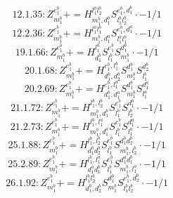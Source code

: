 \documentclass[letterpaper,10pt,fleqn,leqno,onecolumn]{article}
\begin{document}
\begin{equation} \;\;\;\;\;\;  12.1.35: Z^{e_{1}^{b}}_{m_{1}^{b}}+=H^{l_{1}^{b}l_{2}^{b}}_{m_{1}^{b},d_{1}^{b}}S^{e_{1}^{b},d_{1}^{b}}_{l_{1}^{b}l_{2}^{b}}\cdot -1/1 \end{equation}
\begin{equation} \;\;\;\;\;\;  12.2.36: Z^{e_{1}^{b}}_{m_{1}^{b}}+=H^{l_{1}^{a}l_{1}^{b}}_{m_{1}^{b},d_{1}^{a}}S^{e_{1}^{b},d_{1}^{a}}_{l_{1}^{a}l_{1}^{b}}\cdot -1/1 \end{equation}
\begin{equation} \;\;\;\;\;\;  19.1.66: Z^{e_{1}^{b}}_{m_{1}^{b}}+=H^{l_{1}^{b}}_{d_{1}^{b}}S^{e_{1}^{b}}_{l_{1}^{b}}S^{d_{1}^{b}}_{m_{1}^{b}}\cdot -1/1 \end{equation}
\begin{equation} \;\;\;\;\;\;  20.1.68: Z^{e_{1}^{b}}_{m_{1}^{b}}+=H^{e_{1}^{b},l_{1}^{b}}_{d_{1}^{b},d_{2}^{b}}S^{d_{1}^{b}}_{m_{1}^{b}}S^{d_{2}^{b}}_{l_{1}^{b}} \end{equation}
\begin{equation} \;\;\;\;\;\;  20.2.69: Z^{e_{1}^{b}}_{m_{1}^{b}}+=H^{e_{1}^{b},l_{1}^{a}}_{d_{1}^{b},d_{1}^{a}}S^{d_{1}^{b}}_{m_{1}^{b}}S^{d_{1}^{a}}_{l_{1}^{a}} \end{equation}
\begin{equation} \;\;\;\;\;\;  21.1.72: Z^{e_{1}^{b}}_{m_{1}^{b}}+=H^{l_{1}^{b},l_{2}^{b}}_{m_{1}^{b},d_{1}^{b}}S^{e_{1}^{b}}_{l_{1}^{b}}S^{d_{1}^{b}}_{l_{2}^{b}}\cdot -1/1 \end{equation}
\begin{equation} \;\;\;\;\;\;  21.2.73: Z^{e_{1}^{b}}_{m_{1}^{b}}+=H^{l_{1}^{b},l_{1}^{a}}_{m_{1}^{b},d_{1}^{a}}S^{e_{1}^{b}}_{l_{1}^{b}}S^{d_{1}^{a}}_{l_{1}^{a}}\cdot -1/1 \end{equation}
\begin{equation} \;\;\;\;\;\;  25.1.88: Z^{e_{1}^{b}}_{m_{1}^{b}}+=H^{l_{1}^{b},l_{2}^{b}}_{d_{1}^{b}d_{2}^{b}}S^{e_{1}^{b}}_{l_{1}^{b}}S^{d_{1}^{b}d_{2}^{b}}_{m_{1}^{b},l_{2}^{b}}\cdot -1/1 \end{equation}
\begin{equation} \;\;\;\;\;\;  25.2.89: Z^{e_{1}^{b}}_{m_{1}^{b}}+=H^{l_{1}^{b},l_{1}^{a}}_{d_{1}^{a}d_{1}^{b}}S^{e_{1}^{b}}_{l_{1}^{b}}S^{d_{1}^{a}d_{1}^{b}}_{m_{1}^{b},l_{1}^{a}}\cdot -1/1 \end{equation}
\begin{equation} \;\;\;\;\;\;  26.1.92: Z^{e_{1}^{b}}_{m_{1}^{b}}+=H^{l_{1}^{b}l_{2}^{b}}_{d_{1}^{b},d_{2}^{b}}S^{d_{1}^{b}}_{m_{1}^{b}}S^{e_{1}^{b},d_{2}^{b}}_{l_{1}^{b}l_{2}^{b}}\cdot -1/1 \end{equation}
\end{document}
